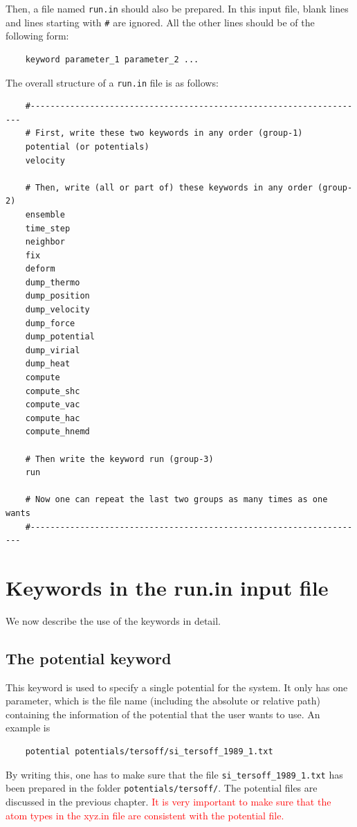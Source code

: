 \documentclass[12pt,a4paper]{report}
\begin{document}
Then, a file named \verb"run.in" should also be prepared. In this input file, blank lines and lines starting with \verb"#" are ignored. All the other lines should be of the following form:
\begin{verbatim}
    keyword parameter_1 parameter_2 ...
\end{verbatim}
The overall structure of a \verb"run.in" file is as follows:
\begin{verbatim}
    #--------------------------------------------------------------------
    # First, write these two keywords in any order (group-1)
    potential (or potentials)
    velocity

    # Then, write (all or part of) these keywords in any order (group-2)
    ensemble
    time_step
    neighbor
    fix
    deform
    dump_thermo
    dump_position
    dump_velocity
    dump_force
    dump_potential
    dump_virial
    dump_heat
    compute
    compute_shc
    compute_vac
    compute_hac
    compute_hnemd

    # Then write the keyword run (group-3)
    run

    # Now one can repeat the last two groups as many times as one wants
    #--------------------------------------------------------------------
\end{verbatim}


\section{Keywords in the run.in input file}
We now describe the use of the keywords in detail.

\subsection{The potential keyword}

This keyword is used to specify a single potential for the system. It only has one parameter, which is the file name (including the absolute or relative path) containing the information of the potential that the user wants to use. An example is
\begin{verbatim}
    potential potentials/tersoff/si_tersoff_1989_1.txt
\end{verbatim}
By writing this, one has to make sure that the file \verb"si_tersoff_1989_1.txt" has been prepared in the folder \verb"potentials/tersoff/".
The potential files are discussed in the previous chapter. \textcolor{red}{It is very important to make sure that the atom types in the xyz.in file are consistent with the potential file.}
\end{document}
